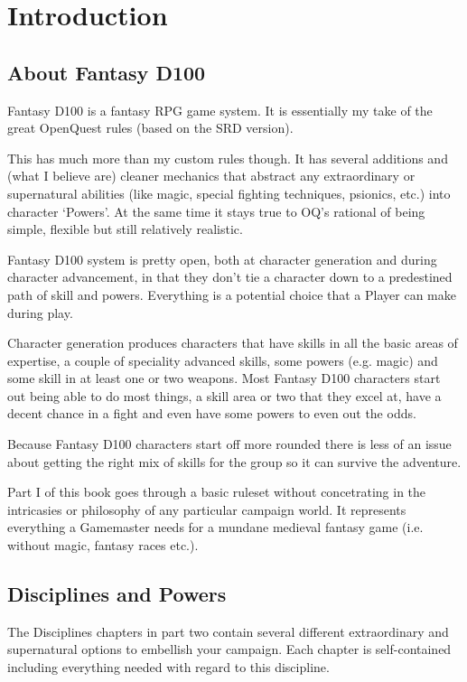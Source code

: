 \chapter{Introduction}
\label{ch:introduction}


\section{About Fantasy D100}

Fantasy D100 is a fantasy RPG game system. It is essentially my take of the great OpenQuest rules (based on the SRD version).

This has much more than my custom rules though. It has several additions and (what I believe are) cleaner mechanics that abstract any extraordinary or supernatural abilities (like magic, special fighting techniques, psionics, etc.) into character `Powers'. At the same time it stays true to OQ's rational of being simple, flexible but still relatively realistic.

Fantasy D100 system is pretty open, both at character generation and during character advancement, in that they don’t tie a character down to a predestined path of skill and powers. Everything is a potential choice that a Player can make during play.

Character generation produces characters that have skills in all the basic areas of expertise, a couple of speciality advanced skills, some powers (e.g. magic) and some skill in at least one or two weapons. Most Fantasy D100 characters start out being able to do most things, a skill area or two that they excel at, have a decent chance in a fight and even have some powers to even out the odds.

Because Fantasy D100 characters start off more rounded there is less of an issue about getting the right mix of skills for the group so it can survive the adventure.

Part I of this book goes through a basic ruleset without concetrating in the intricasies or philosophy of any particular campaign world. It represents everything a Gamemaster needs for a mundane medieval fantasy game (i.e. without magic, fantasy races etc.). 


\section{Disciplines and Powers}
The Disciplines chapters in part two contain several different extraordinary and supernatural options to embellish your campaign. Each chapter is self-contained including everything needed with regard to this discipline. 

